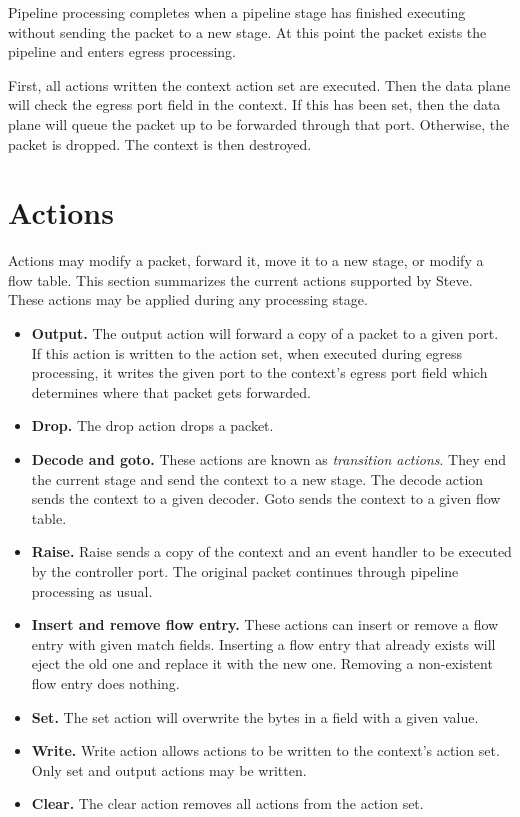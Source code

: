 Pipeline processing completes when a pipeline stage has finished executing
without sending the packet to a new stage. At this point the packet exists the
pipeline and enters egress processing.

First, all actions written the context action set are executed. Then the data
plane will check the egress port field in the context. If this has been set,
then the data plane will queue the packet up to be forwarded through that port.
Otherwise, the packet is dropped. The context is then destroyed.

\section{Actions} \label{action_desc}

Actions may modify a packet, forward it, move it to a new stage, or modify a
flow table. This section summarizes the current actions supported by Steve.
These actions may be applied during any processing stage.

\begin{itemize}

\item \textbf{Output.} The output action will forward a copy of a packet to a
given
port. If this action is written to the action set, when executed during egress
processing, it writes the given port to the context's egress port field which
determines where that packet gets forwarded.

\item \textbf{Drop.} The drop action drops a packet.

\item \textbf{Decode and goto.} These actions are known as \emph{transition
actions}. They end the current stage and send the context to a new stage. The
decode action sends the context to a given decoder. Goto sends the context to a
given flow table.

\item \textbf{Raise.} Raise sends a copy of the context and an event handler to
be
executed by the controller port. The original packet continues through pipeline
processing as usual.

\item \textbf{Insert and remove flow entry.} These actions can insert or remove
a flow
entry with given match fields. Inserting a flow entry that already exists will
eject the old one and replace it with the new one. Removing a non-existent flow
entry does nothing.

\item \textbf{Set.} The set action will overwrite the bytes in a field with a
given
value.

\item \textbf{Write.} Write action allows actions to be written to the context's
action set. Only set and output actions may be written.

\item \textbf{Clear.} The clear action removes all actions from the action set.

\end{itemize}

